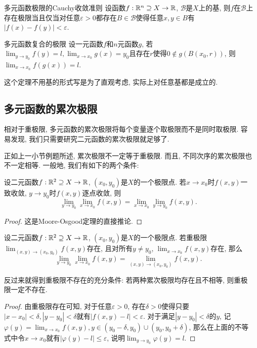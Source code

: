 \begin{theorem}{多元函数极限的Cauchy收敛准则}
	设函数$f:\mathbb{R} ^n \supseteq X \to \mathbb{R}$, $\mathcal{B}$是$X$上的基, 则$f$在$\mathcal{B}$上存在极限当且仅当对任意$\varepsilon >0$都存在$B \in \mathcal{B}$使得任意$x,y \in B$有$|f(x)-f(y)|<\varepsilon$. 
\end{theorem}

\begin{theorem}{多元函数复合的极限}
	设一元函数$f$和$n$元函数$g$, 若$\lim_{y\to y_0} f(y)=l, \lim_{x \to x_0}g(x) = y_0$且存在$r$使得$0 \notin g(B(x_0,r))$, 则$\lim_{x \to x_0} f(g(x)) = l$. 
\end{theorem}
\begin{remark}
	这个定理不用基的形式写是为了直观考虑, 实际上对任意基都是成立的. 
\end{remark}

\subsection{多元函数的累次极限}

相对于重极限, 多元函数的累次极限将每个变量逐个取极限而不是同时取极限. 容易发现, 我们只需要研究二元函数的累次极限就足够了. 

正如上一小节例题所述, 累次极限不一定等于重极限. 而且, 不同次序的累次极限也不一定相等. 一般地, 我们有如下的两个条件: 

\begin{proposition}{}
	设二元函数$f:\mathbb{R} ^2 \supseteq X \to \mathbb{R}$, $(x_0,y_0)$是$X$的一个极限点. 若$x \to x_0$时$f(x,y)$一致收敛, $y \to y_0$时$f(x,y)$逐点收敛, 则$$\lim_{y\to y_0} \lim_{x \to x_0} f(x,y) = \lim_{x\to x_0} \lim_{y \to y_0} f(x,y). $$
\end{proposition}
\begin{proof}
	这是Moore-Osgood定理的直接推论. 
\end{proof}

\begin{proposition}{}
	设二元函数$f:\mathbb{R} ^2 \supseteq X \to \mathbb{R}$, $(x_0,y_0)$是$X$的一个极限点. 若重极限$\lim_{(x,y) \to (x_0,y_0)} f(x,y)$存在, 且对所有$y \neq y_0$, $\lim_{x \to x_0} f(x,y)$存在, 那么$$\lim_{y\to y_0} \lim_{x \to x_0} f(x,y) = \lim_{(x,y) \to (x_0,y_0)} f(x,y).$$
\end{proposition}
\begin{remark}
	反过来就得到重极限不存在的充分条件: 若两种累次极限均存在且不相等, 则重极限一定不存在. 
\end{remark}
\begin{proof}
	由重极限存在可知, 对于任意$\varepsilon >0$, 存在$\delta >0$使得只要$|x-x_0|<\delta,|y-y_0|<\delta$就有$|f(x,y)-l|<\varepsilon$. 对于满足$|y-y_0|<\delta$的$y$, 记$\varphi (y) = \lim_{x \to x_0} f(x,y), y \in (y_0-\delta ,y_0) \cup (y_0,y_0 + \delta)$, 那么在上面的不等式中令$x \to x_0$就有$|\varphi (y) - l | \leq \varepsilon$, 说明$\lim_{y \to y_0} \varphi (y) = l$. 
\end{proof}

